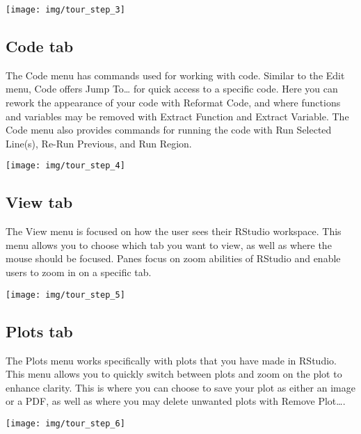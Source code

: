 \documentclass[
]{book}
\begin{document}
\begin{center}\texttt{[image: img/tour\_step\_3]} \end{center}

\hypertarget{code-tab}{%
\subsection{Code tab}\label{code-tab}}

The Code menu has commands used for working with code. Similar to the Edit menu, Code offers Jump To\ldots{} for quick access to a specific code. Here you can rework the appearance of your code with Reformat Code, and where functions and variables may be removed with Extract Function and Extract Variable. The Code menu also provides commands for running the code with Run Selected Line(s), Re-Run Previous, and Run Region.

\begin{center}\texttt{[image: img/tour\_step\_4]} \end{center}

\hypertarget{view-tab}{%
\subsection{View tab}\label{view-tab}}

The View menu is focused on how the user sees their RStudio workspace. This menu allows you to choose which tab you want to view, as well as where the mouse should be focused. Panes focus on zoom abilities of RStudio and enable users to zoom in on a specific tab.

\begin{center}\texttt{[image: img/tour\_step\_5]} \end{center}

\hypertarget{plots-tab}{%
\subsection{Plots tab}\label{plots-tab}}

The Plots menu works specifically with plots that you have made in RStudio. This menu allows you to quickly switch between plots and zoom on the plot to enhance clarity. This is where you can choose to save your plot as either an image or a PDF, as well as where you may delete unwanted plots with Remove Plot\ldots.

\begin{center}\texttt{[image: img/tour\_step\_6]} \end{center}
\end{document}
